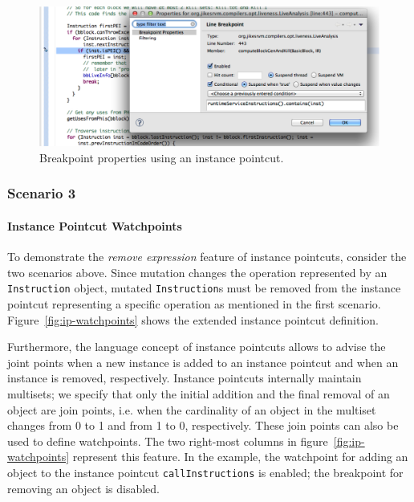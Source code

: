\begin{figure}
\centering
\includegraphics[scale=0.7]{images/breakpointProperties.png}
\caption{Breakpoint properties using an instance pointcut.}
\label{fig:breakpoint-properties}
\end{figure}

\subsubsection{Scenario 3}

\paragraph{Instance Pointcut Watchpoints}

To demonstrate the \emph{remove expression} feature of instance pointcuts, consider the two scenarios above.
Since mutation changes the operation represented by an \lstinline!Instruction! object, mutated \lstinline!Instruction!s must be removed from the instance pointcut representing a specific operation as mentioned in the first scenario.
Figure~\ref{fig:ip-watchpoints} shows the extended instance pointcut definition.

Furthermore, the language concept of instance pointcuts allows to advise the joint points when a new instance is added to an instance pointcut and when an instance is removed, respectively.
Instance pointcuts internally maintain multisets; we specify that only the initial addition and the final removal of an object are join points, i.e. when the cardinality of an object in the multiset changes from 0 to 1 and from 1 to 0, respectively.
These join points can also be used to define watchpoints.
The two right-most columns in figure~\ref{fig:ip-watchpoints} represent this feature.
In the example, the watchpoint for adding an object to the instance pointcut \lstinline!callInstructions! is enabled; the breakpoint for removing an object is disabled.

